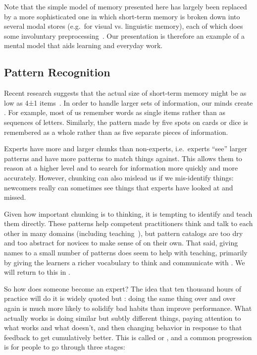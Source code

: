Note that the simple model of memory presented here has largely been replaced by a more sophisticated one
in which short-term memory is broken down into several modal stores
(e.g.\ for visual vs. linguistic memory),
each of which does some involuntary preprocessing~\cite{Mill2016a}.
Our presentation is therefore an example of a mental model that aids learning and everyday work.

\subsection*{Pattern Recognition}

Recent research suggests that the actual size of short-term memory
might be as low as 4±1 items~\cite{Dida2016}.
In order to handle larger sets of information,
our minds create .
For example,
most of us remember words as single items rather than as sequences of letters.
Similarly,
the pattern made by five spots on cards or dice is remembered as a whole
rather than as five separate pieces of information.

Experts have more and larger chunks than non-experts,
i.e.\ experts ``see'' larger patterns and have more patterns to match things against.
This allows them to reason at a higher level
and to search for information more quickly and more accurately.
However,
chunking can also mislead us if we mis-identify things:
newcomers really can sometimes see things that experts have looked at and missed.

Given how important chunking is to thinking,
it is tempting to identify 
and teach them directly.
These patterns help competent practitioners think and talk to each other in many domains (including teaching~\cite{Berg2012}),
but pattern catalogs are too dry and too abstract for novices to make sense of on their own.
That said,
giving names to a small number of patterns does seem to help with teaching,
primarily by giving the learners a richer vocabulary to think and communicate with \cite{Kuit2004,Byck2005,Saja2006}.
We will return to this in .


So how does someone become an expert?
The idea that ten thousand hours of practice will do it is widely quoted
but :
doing the same thing over and over again is much more likely to solidify bad habits than improve performance.
What actually works is doing similar but subtly different things,
paying attention to what works and what doesn't,
and then changing behavior in response to that feedback to get cumulatively better.
This is called 
or ,
and a common progression is for people to go through three stages:

